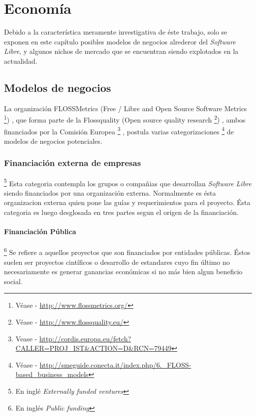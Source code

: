 \chapter{Econom\'ia}
%
%
Debido a la caracter\'istica meramente investigativa de \'este trabajo, solo
se exponen en este cap\'itulo posibles modelos de negocios alrederor del
\emph{Software Libre}, y algunos nichos de mercado que se encuentran siendo
explotados en la actualidad.\\

\section{Modelos de negocios}
La organizaci\'on FLOSSMetrics 
(Free / Libre and Open Source Software Metrics
\footnote{V\'ease - \url{http://www.flossmetrics.org/}})
, que forma parte de la Flossquality (Open source quality research
\footnote{V\'ease - \url{http://www.flossquality.eu/}})
, ambos financiados por la Comisi\'on Europea
\footnote{Vease -
\url{http://cordis.europa.eu/fetch?CALLER=PROJ_IST&ACTION=D&RCN=79449}}
, postula varias categorizaciones
\footnote{V\'ease -
\url{http://smeguide.conecta.it/index.php/6._FLOSS-based_business_models}} 
de modelos de negocios potenciales.


\subsection{Financiaci\'on externa de empresas}\footnote{En ingl\'e
\emph{Externally funded ventures}}
%
Esta categoria contempla los grupos o compa\~nias que desarrollan
\emph{Software Libre} siendo financiados por una organizaci\'on externa.
Normalmente es \'esta organizacion externa quien pone las gu\'ias y
requerimientos para el proyecto. \'Esta categoria es luego desglosada en tres
partes segun el origen de la financiaci\'on.

\subsubsection{Financiaci\'on P\'ublica}\footnote{En ingl\'es \emph{Public
funding}}
%
Se refiere a aquellos proyectos que son financiados por entidades p\'ublicas.
\'Estos suelen ser proyectos cint\'ificos o desarrollo de estandares cuyo fin
\'ultimo no necesariamente es generar ganancias econ\'omicas si no m\'as bien
algun beneficio social.

